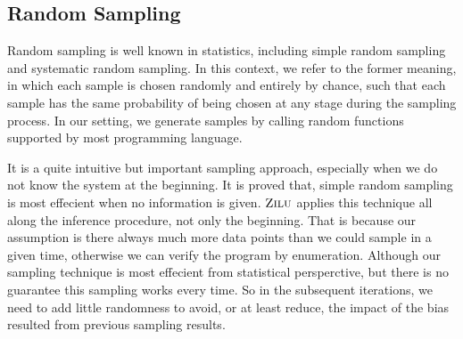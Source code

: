 
\subsection{Random Sampling}
Random sampling is well known in statistics, including simple random sampling and systematic random sampling.
In this context, we refer to the former meaning, in which each sample is chosen randomly and entirely by chance, 
such that each sample has the same probability of being chosen at any stage during the sampling process.
In our setting, we generate samples by calling random functions supported by most programming language.

It is a quite intuitive but important sampling approach, especially when we do not know the system at the beginning. 
It is proved that, simple random sampling is most effecient when no information is given.
$\textsc{Zilu}$ applies this technique all along the inference procedure, not only the beginning. 
That is because our assumption is there always much more data points than we could sample in a given time,
otherwise we can verify the program by enumeration.
Although our sampling technique is most effecient from statistical persperctive, 
but there is no guarantee this sampling works every time.
So in the subsequent iterations, we need to add little randomness to avoid, or at least reduce, 
the impact of the bias resulted from previous sampling results.


